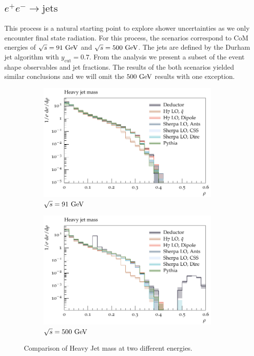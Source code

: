 \subsection{$e^+e^-\to\text{jets}$}
\label{sec:psunc:results:ee}
This process is a natural starting point to explore shower uncertainties as we only encounter final state radiation. For this process, the scenarios correspond to CoM energies of $\sqrt{s}=91~\textrm{GeV}$ and $\sqrt{s}=500~\textrm{GeV}$. The jets are defined by the Durham jet algorithm with $y_\mathrm{cut}=0.7$. From the analysis we present a subset of the event shape observables and jet fractions. The results of the both scenarios yielded similar conclusions and we will omit the $500~\textrm{GeV}$ results with one exception. 
\begin{figure}[h]
  \centering
  \begin{subfigure}[t]{0.49\textwidth}
    \includegraphics[width=\textwidth]{plots/EE-91-MuShower/MC_EETOJETS/HeavyJetMass.pdf}
    \caption{$\sqrt{s} = 91~\textrm{GeV}$}
    \label{fig:ee:heavyjetmass:91}
  \end{subfigure}
  \begin{subfigure}[t]{0.49\textwidth}
    \includegraphics[width=\textwidth]{plots/EE-500-MuShower/MC_EETOJETS/HeavyJetMass.pdf}
    \caption{$\sqrt{s} = 500~\textrm{GeV}$}
    \label{fig:ee:heavyjetmass:500}
  \end{subfigure}
  \caption{Comparison of Heavy Jet mass at two different energies.}
  \label{fig:ee:heavyjetmass}
\end{figure}

